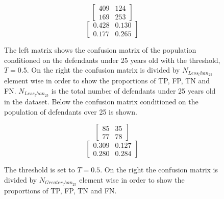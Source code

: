 \documentclass[11pt, fleqn, titlepage]{article}
\begin{document}
	\begin{figure}[h]	
		\begin{multicols}{2}
			\begin{ceqn}
				\begin{equation*}
				\begin{bmatrix}
				409 & 124  \\
				169 & 253 
				\end{bmatrix} 
				\end{equation*} 
				\begin{equation*}
				\begin{bmatrix}
				0.428 & 0.130  \\
				0.177 & 0.265 
				\end{bmatrix} 
				\end{equation*}
			\end{ceqn}
		\end{multicols}
		{The left matrix shows the confusion matrix of the population conditioned on the defendants under 25 years old with the threshold, $ T = 0.5 $. On the right the confusion matrix is divided by $ N_{Less_than_25} $ element wise in order to show the proportions of TP, FP, TN and FN. $ N_{Less_than_25} $ is the total number of defendants under 25 years old in the dataset. Below the confusion matrix conditioned on the population of defendants over 25 is shown.}
	\end{figure}
	\begin{figure}[h]	
		\begin{multicols}{2}
			\begin{ceqn}
				\begin{equation*}
				\begin{bmatrix}
				85 & 35  \\
				77 & 78 
				\end{bmatrix} 
				\end{equation*} 
				\begin{equation*}
				\begin{bmatrix}
				0.309 & 0.127 \\
				0.280 & 0.284 
				\end{bmatrix} 
				\end{equation*}
			\end{ceqn}
		\end{multicols}
		{The threshold is set to $ T = 0.5 $. On the right the confusion matrix is divided by $ N_{Greater_than_25} $ element wise in order to show the proportions of TP, FP, TN and FN.}
	\end{figure}
	
\end{document}
